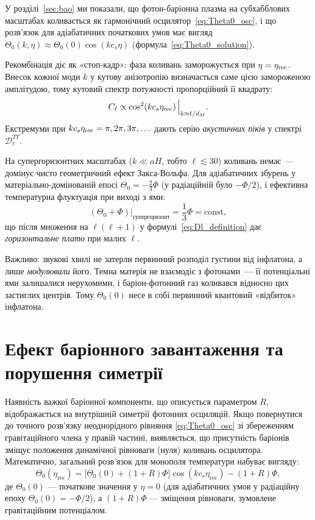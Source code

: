 У розділі~\ref{sec:bao} ми показали, що фотон-баріонна
плазма на субхабблових масштабах коливається як
гармонічний осцилятор~\eqref{eq:Theta0_osc}, і що
розв'язок для адіабатичних початкових умов має вигляд
$\Theta_0(k,\eta) \approx \Theta_0(0)\cos(kc_s\eta)$
(формула~\eqref{eq:Theta0_solution}).

Рекомбінація діє як «стоп-кадр»: фаза коливань
заморожується при $\eta = \eta_{\rm rec}$.
Внесок кожної моди $k$ у кутову анізотропію визначається
саме цією замороженою амплітудою, тому кутовий спектр
потужності пропорційний її квадрату:
\begin{equation}\label{eq:Cl_cos2}
  C_\ell \propto \cos^2\!\left(kc_s\eta_{\rm rec}\right)
  \Big|_{k \approx \ell/d_M}.
\end{equation}
Екстремуми при $kc_s\eta_{\rm rec} = \pi, 2\pi, 3\pi,\ldots$
дають серію \emph{акустичних піків} у спектрі
$\mathcal{D}_\ell^{TT}$.

На супергоризонтних масштабах ($k \ll aH$, тобто
$\ell \lesssim 30$) коливань немає~--- домінує чисто
геометричний ефект Закса-Вольфа.
Для адіабатичних збурень у матеріально-домінованій епосі $\Theta_0 = -\tfrac{2}{3}\Phi$
(у радіаційній було $-\Phi/2$), і ефективна температурна флуктуація при виході з ями:
\begin{equation}
  \left(\Theta_0 + \Phi\right)\Big|_{\text{супергоризонт}}
  = \frac{1}{3}\Phi = \mathrm{const},
\end{equation}
що після множення на $\ell(\ell+1)$ у
формулі~\eqref{eq:Dl_definition} дає \emph{горизонтальне
плато} при малих $\ell$.

Важливо: звукові хвилі не затерли первинний розподіл
густини від інфлатона, а лише \emph{модулювали} його.
Темна матерія не взаємодіє з фотонами~--- її потенціальні
ями залишалися нерухомими, і баріон-фотонний газ
коливався відносно цих застиглих центрів.
Тому $\Theta_0(0)$ несе в собі первинний квантовий
«відбиток» інфлатона.

\section{Ефект баріонного завантаження та порушення симетрії}
\label{subsec:baryon_loading_effects}

Наявність важкої баріонної компоненти, що описується параметром $R$, відображається на внутрішній симетрії фотонних осциляцій. Якщо повернутися до точного розв'язку неоднорідного рівняння \eqref{eq:Theta0_osc} зі збереженням гравітаційного члена у правій частині, виявляється, що присутність баріонів зміщує положення динамічної рівноваги (нуля) коливань осцилятора. Математично, загальний розв'язок для монополя температури набуває вигляду:
\begin{equation}\label{eq:shifted_oscillator_final_fixed}
    \Theta_0(\eta_\text{rec}) = \bigl[\Theta_0(0) + (1+R)\Phi\bigr]\cos\!\left(kc_s\eta_\text{rec}\right) - (1+R)\Phi,
\end{equation}
де $\Theta_0(0)$ --- початкове значення у $\eta=0$ (для адіабатичних умов у радіаційну епоху $\Theta_0(0)=-\Phi/2$), а $(1+R)\Phi$ --- зміщення рівноваги, зумовлене гравітаційним потенціалом.

